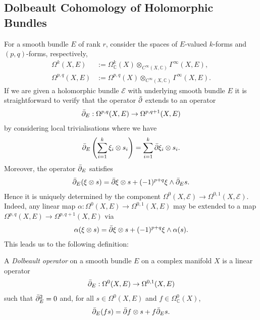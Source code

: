 \documentclass[12pt]{ociamthesis}  %
\begin{document}
\subsection{Dolbeault Cohomology of Holomorphic Bundles}

For a smooth bundle $E$ of rank $r$, consider the spaces of
$E$-valued $k$-forms and $(p,q)$-forms, respectively,
\begin{align*}
  \Omega^k(X,E)     & := \Omega^k_{\mathbb C}(X)\otimes_{C^\infty(X,\mathbb C)}\Gamma^\infty(X,E), \\
  \Omega^{p,q}(X,E) & := \Omega^{p,q}(X)\otimes_{C^\infty(X,\mathbb C)}\Gamma^\infty(X,E).
\end{align*}
If we are given a holomorphic bundle $\mathcal E$ with underlying
smooth bundle $E$
it is straightforward to verify that the operator ${\bar{\partial}}$ extends
to an operator
\begin{align}\label{eq:general_dolbeault_operator}
  {\bar{\partial}}_E : \Omega^{p,q}(X,E) \to \Omega^{p,q+1}(X,E)
\end{align}
by considering local trivialisations where we have
\begin{align*}
  {\bar{\partial}}_E \left({\sum_{i=1}^k \xi_i \otimes s_i}\right)
  = \sum_{i=1}^k {\bar{\partial}} \xi_i \otimes s_i.
\end{align*}
Moreover, the operator ${\bar{\partial}}_E$ satisfies
\begin{align*}
  {\bar{\partial}}_E(\xi \otimes s) = {\bar{\partial}}\xi \otimes s + (-1)^{p+q} \xi \wedge {\bar{\partial}}_E s.
\end{align*}
Hence it is uniquely determined by the component
$\Omega^0(X,\mathcal E) \to \Omega^{0,1}(X,\mathcal E)$. Indeed,
any linear map $\alpha : \Omega^0(X,E) \to \Omega^{0,1}(X,E)$ may be
extended to a map $\Omega^{p,q}(X,E) \to \Omega^{p,q+1}(X,E)$
via
\begin{align*}
  \alpha(\xi \otimes s) = {\bar{\partial}}\xi \otimes s + (-1)^{p+q}\xi\wedge \alpha(s).
\end{align*}
This leads us to the following definition:

\begin{definition}
  A \emph{Dolbeault operator} on a smooth bundle $E$ on a complex
  manifold $X$ is a linear operator
  \begin{align*}
    {\bar{\partial}}_E : \Omega^0(X,E) \to \Omega^{0,1}(X,E)
  \end{align*}
  such that ${\bar{\partial}}_E^2 = 0$ and, for all $s\in\Omega^0(X,E)$ and
  $f\in \Omega^0_{\mathbb C}(X)$,
  \begin{align*}
    {\bar{\partial}}_E (fs) = {\bar{\partial}} f\otimes s + f {\bar{\partial}}_E s.
  \end{align*}
\end{definition}
\end{document}
